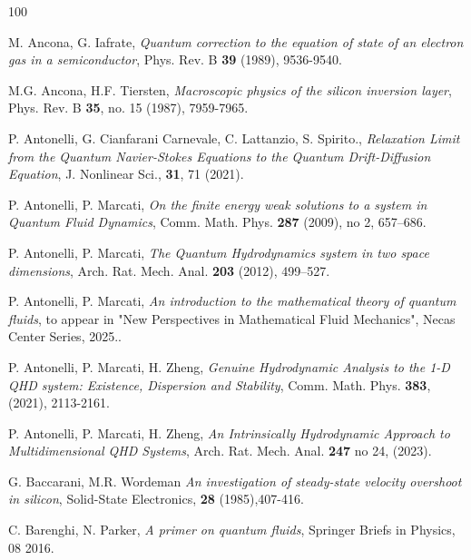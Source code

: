 \documentclass[leqno]{amsart}
\theoremstyle{plain}
\theoremstyle{definition}
\theoremstyle{remark}
\theoremstyle{plain}
\theoremstyle{plain}
\numberwithin{equation}{section}
\begin{document}
\begin{thebibliography}{100}

 M. Ancona, G. Iafrate, \emph{Quantum correction to the equation of state of an electron gas in a semiconductor}, Phys. Rev. B {\bf 39} (1989), 9536-9540.

 M.G. Ancona, H.F. Tiersten, \emph{Macroscopic physics of the silicon inversion layer}, Phys. Rev. B {\bf 35}, no. 15 (1987), 7959-7965.


 P. Antonelli, G. Cianfarani Carnevale, C. Lattanzio, S. Spirito., \emph{ Relaxation Limit from the Quantum Navier-Stokes Equations to the Quantum Drift-Diffusion Equation}, J. Nonlinear Sci., {\bf 31}, 71 (2021).


 P. Antonelli, P. Marcati, \emph{On the finite energy weak solutions to a system in Quantum Fluid Dynamics}, Comm. Math. Phys. {\bf 287} (2009), no 2, 657--686.

 P. Antonelli, P. Marcati, \emph{The Quantum Hydrodynamics system in two space dimensions}, Arch. Rat. Mech. Anal. \textbf{203} (2012), 499--527.

 P. Antonelli, P. Marcati, \emph{An introduction to the mathematical theory of quantum fluids}, to appear in "New Perspectives in Mathematical Fluid Mechanics", Necas Center Series, 2025..


 P. Antonelli, P. Marcati, H. Zheng,  \textit{Genuine Hydrodynamic Analysis to the 1-D QHD system: Existence, Dispersion and Stability},  Comm. Math. Phys. {\bf 383}, (2021), 2113-2161.

 P. Antonelli, P. Marcati, H. Zheng,  \textit{An Intrinsically Hydrodynamic Approach to Multidimensional QHD Systems},  Arch. Rat. Mech. Anal. {\bf 247} no 24, (2023).



 G. Baccarani, M.R. Wordeman \emph{An investigation of steady-state velocity overshoot in silicon}, Solid-State Electronics, {\bf 28} (1985),407-416.

 C. Barenghi, N. Parker, \emph{A primer on quantum fluids}, Springer Briefs in Physics, 08 2016.




\end{thebibliography}
\end{document}
